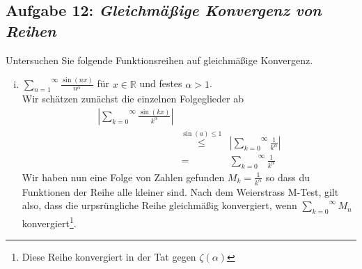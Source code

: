 \documentclass[11pt,a4paper,ngerman]{article}
\begin{document}
\subsection*{Aufgabe 12: \mdseries\itshape Gleichmäßige Konvergenz von Reihen}

Untersuchen Sie folgende Funktionsreihen auf gleichmäßige Konvergenz.

\begin{enumerate}[(i)]

    \item $\overset{\infty}{\underset{n=1}{\sum}} \frac{\sin(nx)}{n^\alpha}$ für $x\in\mathbb{R}$ und festes $\alpha > 1$.\\
        Wir schätzen zunächst die einzelnen Folgeglieder ab
        $$\begin{array}{rcl}
            \left| \overset{\infty}{\underset{k=0}{\sum}} \frac{\sin(kx)}{k^\alpha}\right| \\
                &\stackrel{\sin(a)\leq1}{\leq}&  
                    \left| \overset{\infty}{\underset{k=0}{\sum}} \frac{1}{k^\alpha}\right| \\
                &=& \overset{\infty}{\underset{k=0}{\sum}} \frac{1}{k^\alpha} 
        \end{array}$$
        Wir haben nun eine Folge von Zahlen gefunden $M_k = \frac{1}{k^\alpha}$ so dass
        du Funktionen der Reihe alle kleiner sind. Nach dem Weierstrass M-Test, gilt
        also, dass die urpsrüngliche Reihe gleichmäßig konvergiert, wenn 
        $\overset{\infty}{\underset{k=0}{\sum}} M_n$ konvergiert\footnote{Diese Reihe 
        konvergiert in der Tat gegen $\zeta(\alpha)$}.


\end{enumerate}
\end{document}
